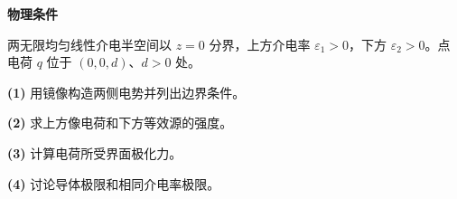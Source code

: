 \textbf{物理条件}\par 两无限均匀线性介电半空间以 \(z=0\) 分界，上方介电率 \(\varepsilon_1>0\)，下方 \(\varepsilon_2>0\)。点电荷 \(q\) 位于 \((0,0,d)\)、\(d>0\) 处。
\par\noindent\textbf{(1)} 用镜像构造两侧电势并列出边界条件。
\par\noindent\textbf{(2)} 求上方像电荷和下方等效源的强度。
\par\noindent\textbf{(3)} 计算电荷所受界面极化力。
\par\noindent\textbf{(4)} 讨论导体极限和相同介电率极限。
